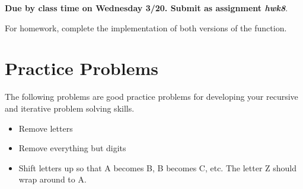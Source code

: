 \documentclass[nobib]{tufte-handout}
\begin{document}
\begin{center}
\textbf{Due by class time on Wednesday 3/20. Submit as assignment \textit{hwk8}}.
\end{center}

For homework, complete the implementation of both versions of the function.

\section{Practice Problems}

The following problems are good practice problems for developing your recursive and iterative problem solving skills.
\begin{itemize}
\item Remove letters
\item Remove everything but digits
\item Shift letters up so that A becomes B, B becomes C, etc.  The letter Z should wrap around to A.
\end{itemize}
\end{document}
